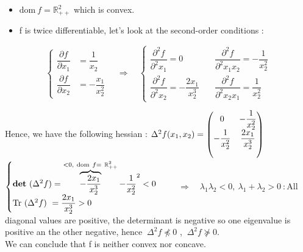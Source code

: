 \documentclass[12pt,a4paper]{article}
\begin{document}
\begin{itemize}
	\item $ \text{dom} ~f=\mathbb{R}^2_{++} $ which is convex.
	\item f is twice differentiable, let's look at the second-order conditions :\\
 \end{itemize}
 \begin{center} 
$$	\begin{cases}
	\dfrac{\partial f}{\partial x_1} &= \dfrac{1}{x_2} \\
	\dfrac{\partial f}{\partial x_2} &= -\dfrac{x_1}{x_2^2}
		\end{cases}
		\quad 
		\Rightarrow
		\quad
		\left\lbrace
		\begin{matrix}
			\dfrac{\partial^2 f}{\partial^2 x_1} = 0 
			&\dfrac{\partial^2 f}{\partial^2 x_1x_2} =  -\dfrac{1}{x_2^2} \\
			\dfrac{\partial^2 f}{\partial^2 x_2} =  -\dfrac{2x_1}{x_2^3} \quad 
			&\dfrac{\partial^2 f}{\partial^2 x_2x_1} =  \dfrac{1}{x_2^2}
		\end{matrix} \right.	$$
	\end{center}
	Hence, we have the following hessian : \def\arraystretch{2}  $ \Delta^2 f(x_1,x_2)=	\begin{pmatrix}
		0	
			&-\dfrac{1}{x_2^2} \\ \bigskip
			 -\dfrac{1}{x_2^2}
			& \dfrac{2x_1}{x_2^3} 
        \end{pmatrix} $\\
	$\begin{cases} \text{\textbf{det}}~(\Delta^2 f )= \overbrace{-\dfrac{2x_1}{x_2^3}}^{<0, ~\text{dom} ~f =~ 
	\mathbb{R}^2_{++}}-{\dfrac{1}{x_2^2}}^2 < 0 \\
	\text{Tr}~(\Delta^2f)~=\dfrac{2x_1}{x_2^3}>0 
\end{cases} $
		$\quad \Rightarrow \quad \lambda_1\lambda_2<0,~\lambda_1+\lambda_2>0~: $All diagonal values are positive,  the determinant is negative so one eigenvalue is positive an the other negative, hence $~\Delta^2f \npreceq 0$ , $~\Delta^2f \nsucceq 0$.
\\ We can conclude that f is neither convex nor concave.
\end{document}
